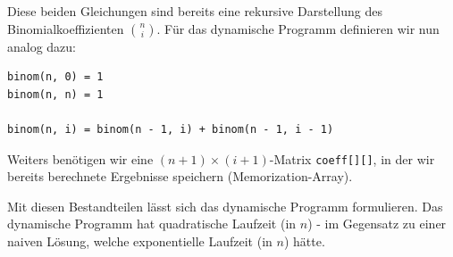 \documentclass{article}
\begin{document}
Diese beiden Gleichungen sind bereits eine rekursive Darstellung des
Binomialkoeffizienten $\binom{n}{i}$. F{\"u}r das dynamische Programm definieren 
wir nun analog dazu:

\begin{verbatim}
binom(n, 0) = 1
binom(n, n) = 1

binom(n, i) = binom(n - 1, i) + binom(n - 1, i - 1)
\end{verbatim}

Weiters ben{\"o}tigen wir eine $(n + 1)\times (i + 1)$-Matrix \texttt{coeff[][]},
in der wir bereits berechnete Ergebnisse speichern (Memorization-Array).

Mit diesen Bestandteilen l{\"a}sst sich das dynamische Programm formulieren. Das
dynamische Programm hat quadratische Laufzeit (in $n$) - im Gegensatz zu einer
naiven L{\"o}sung, welche exponentielle Laufzeit (in $n$) h{\"a}tte.

\begin{minipage}{.315\textwidth}
\begin{algorithm}[H]
    \small
%
%
\end{algorithm}
\end{minipage}
\begin{minipage}{.635\textwidth}
\begin{algorithm}[H]
    \small
%
\end{algorithm}
\end{minipage}
\end{document}
